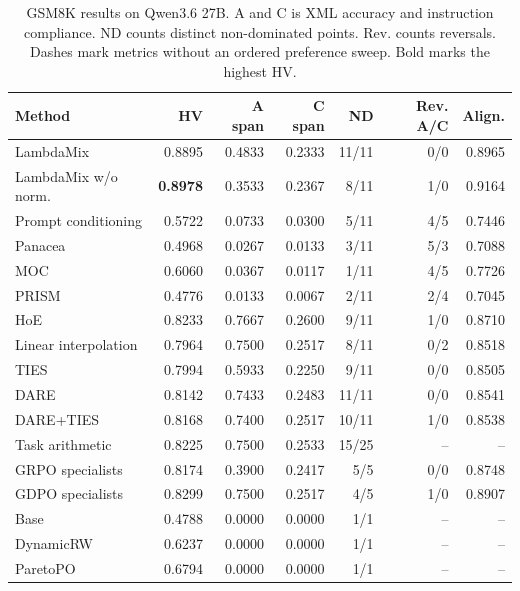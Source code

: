\begin{table}[htbp]
\centering\small
\setlength{\tabcolsep}{3pt}
\caption{GSM8K results on Qwen3.6 27B. A and C is XML accuracy and instruction compliance. ND counts distinct non-dominated points. Rev. counts reversals. Dashes mark metrics without an ordered preference sweep. Bold marks the highest HV.}
\label{tab:full-gsm8k-q27}
\begin{tabular}{@{}lrrrrrr@{}}
\toprule
Method & HV & A span & C span & ND & Rev. A/C & Align.\\
\midrule
LambdaMix & 0.8895 & 0.4833 & 0.2333 & 11/11 & 0/0 & 0.8965\\
LambdaMix w/o norm. & \textbf{0.8978} & 0.3533 & 0.2367 & 8/11 & 1/0 & 0.9164\\
\midrule
Prompt conditioning & 0.5722 & 0.0733 & 0.0300 & 5/11 & 4/5 & 0.7446\\
Panacea & 0.4968 & 0.0267 & 0.0133 & 3/11 & 5/3 & 0.7088\\
MOC & 0.6060 & 0.0367 & 0.0117 & 1/11 & 4/5 & 0.7726\\
PRISM & 0.4776 & 0.0133 & 0.0067 & 2/11 & 2/4 & 0.7045\\
HoE & 0.8233 & 0.7667 & 0.2600 & 9/11 & 1/0 & 0.8710\\
\midrule
Linear interpolation & 0.7964 & 0.7500 & 0.2517 & 8/11 & 0/2 & 0.8518\\
TIES & 0.7994 & 0.5933 & 0.2250 & 9/11 & 0/0 & 0.8505\\
DARE & 0.8142 & 0.7433 & 0.2483 & 11/11 & 0/0 & 0.8541\\
DARE+TIES & 0.8168 & 0.7400 & 0.2517 & 10/11 & 1/0 & 0.8538\\
Task arithmetic & 0.8225 & 0.7500 & 0.2533 & 15/25 & -- & --\\
\midrule
GRPO specialists & 0.8174 & 0.3900 & 0.2417 & 5/5 & 0/0 & 0.8748\\
GDPO specialists & 0.8299 & 0.7500 & 0.2517 & 4/5 & 1/0 & 0.8907\\
\midrule
Base & 0.4788 & 0.0000 & 0.0000 & 1/1 & -- & --\\
DynamicRW & 0.6237 & 0.0000 & 0.0000 & 1/1 & -- & --\\
ParetoPO & 0.6794 & 0.0000 & 0.0000 & 1/1 & -- & --\\
\bottomrule
\end{tabular}
\end{table}